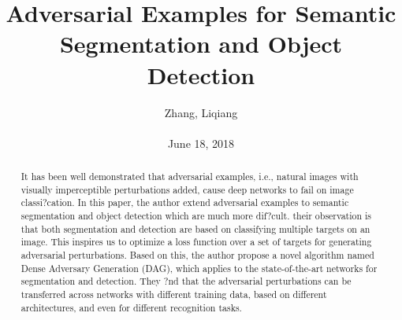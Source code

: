 \documentclass[10pt,twocolumn,letterpaper]{article}
\title{\textbf{Adversarial Examples for Semantic Segmentation and Object Detection}}
\author{Zhang, Liqiang\\\\June 18, 2018}
\begin{document}
\maketitle
\par
\begin{abstract}
  It has been well demonstrated that adversarial examples, i.e., natural images with visually imperceptible perturbations added, cause deep networks to fail on image classi?cation. In this paper, the author extend adversarial examples to semantic segmentation and object detection which are much more dif?cult. their observation is that both segmentation and detection are based on classifying multiple targets on an image. This inspires us to optimize a loss function over a set of targets for generating adversarial perturbations. Based on this, the author propose a novel algorithm named Dense Adversary Generation (DAG), which applies to the state-of-the-art networks for segmentation and detection. They ?nd that the adversarial perturbations can be transferred across networks with different training data, based on different architectures, and even for different recognition tasks.
\end{abstract}
\end{document}
